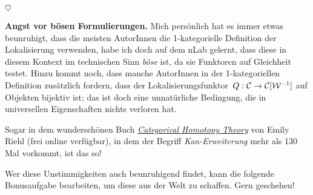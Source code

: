 \documentclass{uebblatt}
\newcommand{\stopper}{\begin{center}$\heartsuit$\end{center}}
\begin{document}
\stopper

\textbf{Angst vor bösen Formulierungen.}
Mich persönlich hat es immer etwas beunruhigt, dass die meisten AutorInnen die
1-kategorielle Definition der Lokalisierung verwenden, habe ich doch auf dem
nLab gelernt, dass diese in diesem Kontext im technischen Sinn \emph{böse} ist,
da sie Funktoren auf Gleichheit testet. Hinzu kommt noch, dass manche AutorInnen
in der 1-kategoriellen Definition zusätzlich fordern, dass der
Lokalisierungsfunktor~$Q : \mathcal{C} \to \mathcal{C}[\mathcal{W}^{-1}]$ auf Objekten bijektiv ist; das
ist doch eine unnatürliche Bedingung, die in universellen Eigenschaften nichts
verloren hat.

Sogar in dem wunderschönen Buch
\href{http://www.math.harvard.edu/~eriehl/cathtpy.pdf}{\emph{Categorical
Homotopy Theory}} von Emily
Riehl (frei online verfügbar), in dem der Begriff \emph{Kan-Erweiterung} mehr als 130 Mal vorkommt,
ist das so!

Wer diese Unstimmigkeiten auch beunruhigend findet, kann die folgende
Bonusaufgabe bearbeiten, um diese aus der Welt zu schaffen. Gern geschehen!
\end{document}
